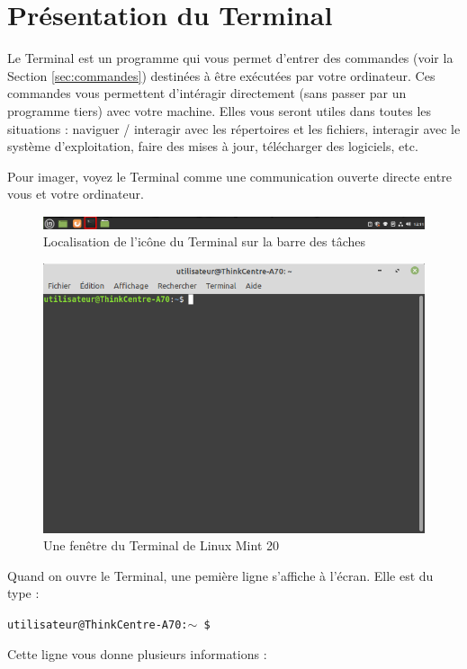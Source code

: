 \documentclass[12pt]{book}
\begin{document}
\section{Présentation du Terminal}
	Le Terminal est un programme qui vous permet d'entrer des commandes (voir la Section \ref{sec:commandes}) destinées à être exécutées par votre ordinateur.
	Ces commandes vous permettent d'intéragir directement (sans passer par un programme tiers) avec votre machine.
	Elles vous seront utiles dans toutes les situations : naviguer / interagir avec les répertoires et les fichiers, interagir avec le système d'exploitation, faire des mises à jour, télécharger des logiciels, etc.\par
	Pour imager, voyez le Terminal comme une communication ouverte directe entre vous et votre ordinateur.
	\begin{figure}[h]
		\centering
		\includegraphics[width=\textwidth]{include/terminal_barre.png}
		\caption{Localisation de l'icône du Terminal sur la barre des tâches}
		\label{fig:terminal_barre}
	\end{figure}
	\begin{figure}[h]
		\centering
		\includegraphics[width=.8\textwidth]{include/terminal.png}
		\caption{Une fenêtre du Terminal de Linux Mint 20}
		\label{fig:terminal_ouvert}
	\end{figure}\par
	Quand on ouvre le Terminal, une pemière ligne s'affiche à l'écran.
	Elle est du type :
	\begin{center}
		\vspace*{-.4cm}
		\texttt{utilisateur@ThinkCentre-A70:$\sim$ \$ }
	\end{center}
	Cette ligne vous donne plusieurs informations :
\end{document}
